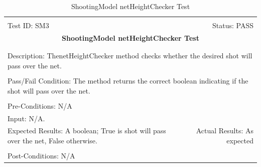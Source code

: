 \documentclass[11pt]{article}
\begin{document}
\begin{center}
\begin{table}[H]
\begin{tabular}{|l r|}\hline&\\[-2mm]
	Test ID: SM3	&Status: PASS\\[-3mm]
	\multicolumn{2}{|c|}{\textbf{\large{ShootingModel netHeightChecker Test}}}\\&\\\hline&\\[-3mm]
	\multicolumn{2}{|p{\textwidth}|}{Description: ThenetHeightChecker method checks whether the desired shot will pass over the net.}\\[1mm]\hline&\\[-3mm]
	\multicolumn{2}{|p{\textwidth}|}{Pass/Fail Condition: The method returns the correct boolean indicating if the shot will pass over the net.}\\[1mm]\hline&\\[-3mm]
	\multicolumn{2}{|p{\textwidth}|}{Pre-Conditions: N/A}\\[4mm]
	\multicolumn{2}{|p{\textwidth}|}{Input: N/A.}\\[2mm]\hline
	\multicolumn{1}{|p{0.49\textwidth}}{Expected Results: A boolean; True is shot will pass over the net, False otherwise.}	&\multicolumn{1}{|p{0.45\textwidth}|}{Actual Results: As expected}\\\hline&\\[-3mm]
	\multicolumn{2}{|p{\textwidth}|}{Post-Conditions: N/A}\\\hline
\end{tabular}
\caption{ShootingModel netHeightChecker Test}
\end{table}
\end{center}
\end{document}
